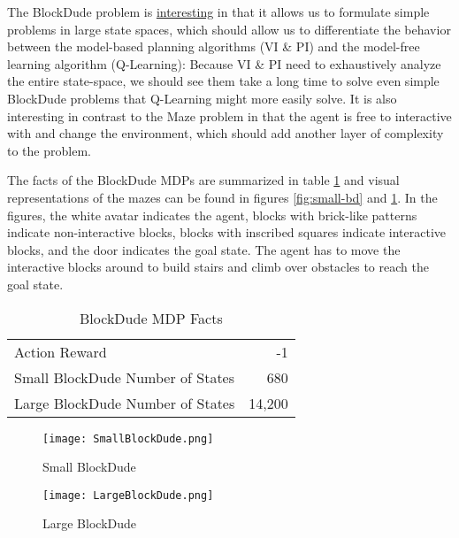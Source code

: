 \documentclass{article}
\begin{document}
The BlockDude problem is \underline{interesting} in that it allows us to formulate simple problems
in large state spaces, which should allow us to differentiate the behavior between the
model-based planning algorithms (VI \& PI) and the model-free learning algorithm
(Q-Learning): Because VI \& PI need to exhaustively analyze the entire state-space,
we should see them take a long time to solve even simple BlockDude problems that
Q-Learning might more easily solve. It is also interesting in contrast to the Maze
problem in that the agent is free to interactive with and change the environment, which
should add another layer of complexity to the problem.

The facts of the BlockDude MDPs are summarized in table \ref{table:bd-facts} and visual
representations of the mazes can be found in figures \ref{fig:small-bd} and
\ref{fig:large-bd}. In the figures, the white avatar indicates the agent, blocks with
brick-like patterns indicate non-interactive blocks, blocks with inscribed squares
indicate interactive blocks, and the door indicates the goal state. The agent has to
move the interactive blocks around to build stairs and climb over obstacles to reach
the goal state.

\begin{table}
    \centering
    \caption{BlockDude MDP Facts}
    \label{table:bd-facts}
    \begin{tabular}{lr}
        \toprule
         Action Reward & -1 \\
         Small BlockDude Number of States & 680 \\
         Large BlockDude Number of States & 14,200 \\
        \bottomrule
        \end{tabular}
\end{table}

\begin{figure}
    \centering
    \begin{minipage}{0.5\textwidth}
        \centering
        \texttt{[image: SmallBlockDude.png]}
        \caption{Small BlockDude}
        \label{fig:small-bd}
    \end{minipage}\hfill
    \begin{minipage}{0.5\textwidth}
        \centering
        \texttt{[image: LargeBlockDude.png]}
        \caption{Large BlockDude}
        \label{fig:large-bd}
    \end{minipage}
\end{figure}
\end{document}
